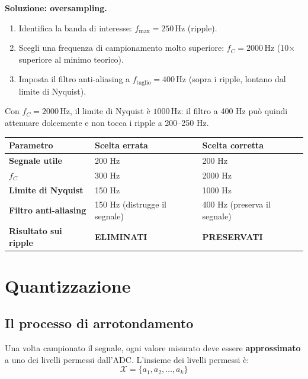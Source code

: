 \documentclass[12pt,a4paper]{article}
\begin{document}
\textbf{Soluzione: oversampling.}

\begin{enumerate}
  \item Identifica la banda di interesse: $f_{\text{max}} = 250\,\text{Hz}$ (ripple).
  \item Scegli una frequenza di campionamento molto superiore: $f_C = 2000\,\text{Hz}$
        (10$\times$ superiore al minimo teorico).
  \item Imposta il filtro anti-aliasing a $f_{\text{taglio}} = 400\,\text{Hz}$
        (sopra i ripple, lontano dal limite di Nyquist).
\end{enumerate}

Con $f_C = 2000\,\text{Hz}$, il limite di Nyquist è $1000\,\text{Hz}$: il filtro a 400 Hz
può quindi attenuare dolcemente e non tocca i ripple a 200--250 Hz.

\medskip
\begin{center}
\renewcommand{\arraystretch}{1.4}
\begin{tabular}{>{\bfseries}p{5cm} p{4.5cm} p{4.5cm}}
\toprule
Parametro & Scelta errata & Scelta corretta \\
\midrule
Segnale utile & 200 Hz & 200 Hz \\
$f_C$ & 300 Hz & 2000 Hz \\
Limite di Nyquist & 150 Hz & 1000 Hz \\
Filtro anti-aliasing & 150 Hz (distrugge il segnale) & 400 Hz (preserva il segnale) \\
Risultato sui ripple & \textcolor{accent}{\textbf{ELIMINATI}} & \textcolor{tealcolor}{\textbf{PRESERVATI}} \\
\bottomrule
\end{tabular}
\end{center}

\section{Quantizzazione}

\subsection{Il processo di arrotondamento}

Una volta campionato il segnale, ogni valore misurato deve essere \textbf{approssimato} a uno
dei livelli permessi dall'ADC. L'insieme dei livelli permessi è:
\[
  \mathcal{X} = \{a_1, a_2, \ldots, a_k\}
\]
\end{document}

